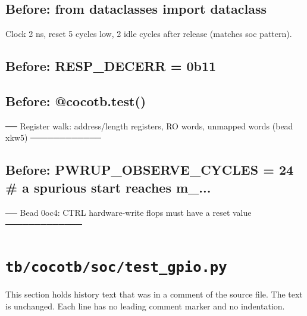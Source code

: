 \begin{record}

\subsection*{Before: from dataclasses import dataclass}

\begin{textblock}
Clock 2 ns, reset 5 cycles low, 2 idle cycles after release (matches soc pattern).
\end{textblock}

\subsection*{Before: RESP\_DECERR = 0b11}


\subsection*{Before: @cocotb.test()}

\begin{textblock}
── Register walk: address/length registers, RO words, unmapped words (bead xkw5) ────────────
\end{textblock}

\subsection*{Before: PWRUP\_OBSERVE\_CYCLES = 24  \# a spurious start reaches m\_...}

\begin{textblock}
── Bead 0oc4: CTRL hardware-write flops must have a reset value ─────────────
\end{textblock}

\end{record}

\section{\texttt{tb/cocotb/soc/test\_gpio.py}}\label{cr:suite:soc-test-gpio}

This section holds history text that was in a comment of the source file. The text is unchanged. Each line has no leading comment marker and no indentation.

